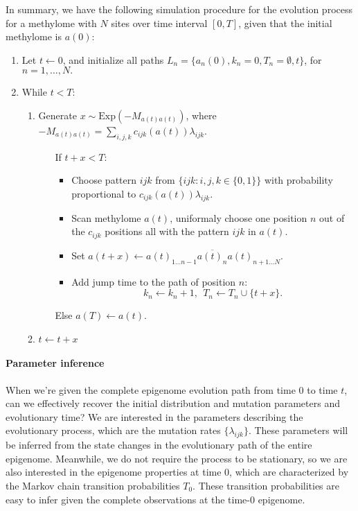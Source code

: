 \documentclass[11pt]{article}
\begin{document}
In summary, we have the following simulation procedure for the evolution
process for a methylome with $N$ sites over time interval $[0, T]$, given
that the initial methylome is $a(0)$:
\begin{enumerate}
\item Let $t \leftarrow 0$, and initialize all paths $L_n = \{a_n(0),
  k_n=0, T_n=\emptyset, t\}$, for $n=1,\ldots, N.$
\item While $t < T$:
  \begin{enumerate}
  \item Generate $x\sim \text{Exp}(-M_{a(t)a(t)})$, where
    $-M_{a(t)a(t)} = \sum\limits_{i,j,k}c_{ijk}(a(t))\lambda_{ijk}$.
    \begin{itemize}
    \item[If] $t+x < T$:
      \begin{itemize}
      \item Choose pattern $ijk$ from $\{ijk: i,j,k\in\{0,1\}\}$ with
        probability proportional to $c_{ijk}(a(t))\lambda_{ijk}$.
      \item Scan methylome $a(t)$, uniformaly choose one position $n$
        out of the $c_{ijk}$ positions all with the pattern $ijk$ in $a(t)$.
      \item Set $a(t+x) \leftarrow a(t)_{1\ldots n-1} \overline{a(t)_n}
        a(t)_{n+1 \ldots N}$.
      \item Add jump time to the path of position $n$: 
        $$k_n \leftarrow k_n +1, ~~ T_n \leftarrow T_n\cup \{t+x\}.$$
      \end{itemize}
    \item[Else] $a(T) \leftarrow a(t)$.
    \end{itemize}
  \item $t \leftarrow t+x$
  \end{enumerate}
\end{enumerate}

\paragraph{Parameter inference} When we're given the complete
epigenome evolution path from time $0$ to time $t$, can we effectively
recover the initial distribution and mutation parameters and
evolutionary time? We are interested in the parameters describing the
evolutionary process, which are the mutation rates
$\{\lambda_{ijk}\}$. These parameters will be inferred from the state
changes in the evolutionary path of the entire epigenome. Meanwhile,
we do not require the process to be stationary, so we are also
interested in the epigenome properties at time 0, which are
characterized by the Markov chain transition probabilities
$T_{0}$. These transition probabilities are easy to infer given the
complete observations at the time-0 epigenome. 
\end{document}
